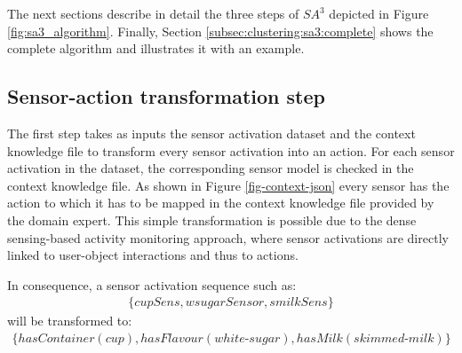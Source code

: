 The next sections describe in detail the three steps of $SA^3$ depicted in Figure \ref{fig:sa3_algorithm}. Finally, Section \ref{subsec:clustering:sa3:complete} shows the complete algorithm and illustrates it with an example.


\subsection{Sensor-action transformation step}
\label{subsec:clustering:sa3:transform}

The first step takes as inputs the sensor activation dataset and the context knowledge file to transform every sensor activation into an action. For each sensor activation in the dataset, the corresponding sensor model is checked in the context knowledge file. As shown in Figure \ref{fig-context-json} every sensor has the action to which it has to be mapped in the context knowledge file provided by the domain expert. This simple transformation is possible due to the dense sensing-based activity monitoring approach, where sensor activations are directly linked to user-object interactions and thus to actions. 

In consequence, a sensor activation sequence such as:
 \begin{equation*}
 \begin{split}
   \{cupSens, wsugarSensor, smilkSens\}
 \end{split}  
 \end{equation*}
 will be transformed to:
 \begin{equation*}
 \begin{split}
  \{hasContainer(cup), hasFlavour(white\text{-}sugar), hasMilk(skimmed\text{-}milk)\}
 \end{split}   
 \end{equation*}
 
